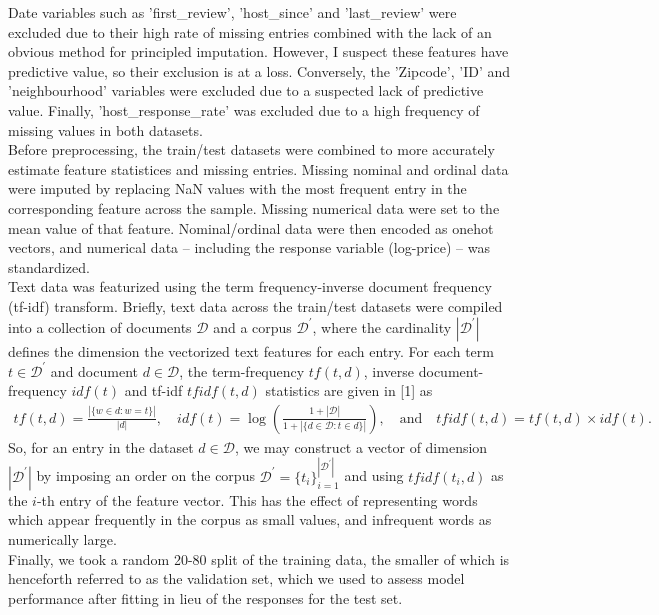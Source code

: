 \documentclass[11pt]{article}
\newcommand{\bp}[1]{\left({#1}\right)}
\newcommand{\1}[1]{\mathbbm{1}_{#1}}
\newcommand{\mc}[1]{\mathcal{#1}}
\begin{document}
Date variables such as 'first\_review', 'host\_since' and 'last\_review' were excluded due to their high rate of missing entries combined with the lack of
an obvious method for principled imputation. However, I suspect these features have predictive value, so their exclusion is at a loss. Conversely, the 'Zipcode', 'ID'
and 'neighbourhood' variables were excluded due to a suspected lack of predictive value. Finally, 'host\_response\_rate' was excluded due to a high frequency of missing
values in both datasets.\\[5pt]
Before preprocessing, the train/test datasets were combined to more accurately estimate feature statistices and missing entries. Missing nominal and ordinal data were imputed by replacing NaN values with the most frequent entry
in the corresponding feature across the sample. Missing numerical data were set to the mean value of that feature. Nominal/ordinal data were then encoded as onehot vectors, and numerical
data -- including the response variable (log-price) -- was standardized.\\[5pt]
Text data was featurized using the term frequency-inverse document frequency (tf-idf) transform. Briefly, text data across the train/test datasets were compiled into a collection of documents $\mc{D}$ and a corpus $\mc{D}^\prime$, where the cardinality $|\mc{D}^\prime|$
defines the dimension the vectorized text features for each entry. For each term $t\in\mc{D}^\prime$ and document $d\in\mc{D}$, the term-frequency $tf(t,d)$, inverse document-frequency $idf(t)$ and tf-idf $tfidf(t,d)$ statistics are given in [1] as
\begin{align*}
    tf(t,d)=\frac{|\{w\in d: w=t\}|}{|d|},\quad idf(t)=\log\bp{\frac{1+|\mc{D}|}{1+|\{d\in\mc{D}:t\in d\}|}},\quad\text{and}\quad tfidf(t,d)=tf(t,d)\times idf(t).
\end{align*}
So, for an entry in the dataset $d\in\mc{D}$, we may construct a vector of dimension $|\mc{D}^\prime|$ by imposing an order on the corpus $\mc{D}^\prime=\{t_i\}_{i=1}^{|\mc{D}^\prime|}$ and using $tfidf(t_i,d)$ as the $i$-th entry of the feature vector. This has the effect of representing words which appear frequently in the corpus as small values, and infrequent words as numerically large.\\[5pt]
Finally, we took a random 20-80 split of the training data, the smaller of which is henceforth referred to as the validation set, which we used to assess model performance after fitting in lieu of the responses for the test set.\\[5pt] 
\end{document}
